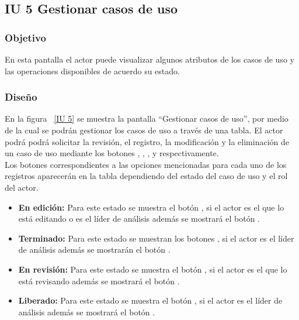 \subsection{IU 5 Gestionar casos de uso}
\subsubsection{Objetivo}
	
	En esta pantalla el actor puede visualizar algunos atributos de los casos de uso y las operaciones disponibles de acuerdo su estado.

\subsubsection{Diseño}

    En la figura ~\ref{IU 5} se muestra la pantalla ``Gestionar casos de uso'', por medio de la cual 
    se podrán gestionar los casos de uso a través de una tabla.
    El actor podrá podrá solicitar la revisión, el registro, la modificación y la eliminación de un caso de uso mediante los botones
    \btnRevisar, \btnNuevo, \btnConsulta, \btnEditar y \btnEliminar respectivamente. \\
    
    Los botones correspondientes a las opciones mencionadas para cada uno de los registros aparecerán en la tabla dependiendo del estado
    del caso de uso y el rol del actor.
    	
    \begin{itemize}
	    \item {\bf En edición:} Para este estado se muestra el botón \btnConsulta, si el actor es el que lo está editando o es el líder de análisis además se mostrará el botón \btnEditar.
            \item {\bf Terminado:} Para este estado se muestran los botones \btnConsulta \btnRevisar \btnEliminar, si el actor es el líder de análisis además se mostrarán el botón \btnEditar.
            \item {\bf En revisión:} Para este estado se muestra el botón \btnConsulta, si el actor es el que lo está revisando además se mostrará el botón \btnRevisar.
            \item {\bf Liberado:} Para este estado se muestra el botón \btnConsulta, si el actor es el líder de análisis además se mostrará el botón \btnEditar.
    \end{itemize}




